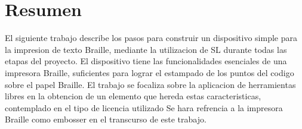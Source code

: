 \chapter{Resumen}


El siguiente trabajo describe los pasos para construir un dispositivo simple
para la impresion de texto Braille, mediante la utilizacion de SL durante todas
las etapas del proyecto. El dispositivo tiene las funcionalidades esenciales de
una impresora Braille, suficientes para lograr el estampado de los puntos del
codigo sobre el papel Braille. El trabajo se focaliza sobre la aplicacion de
herramientas libres en la obtencion de un elemento que hereda estas
caracteristicas, contemplado en el tipo de licencia utilizado %
Se hara refrencia a la impresora Braille como embosser en el transcurso de este
trabajo.

%

